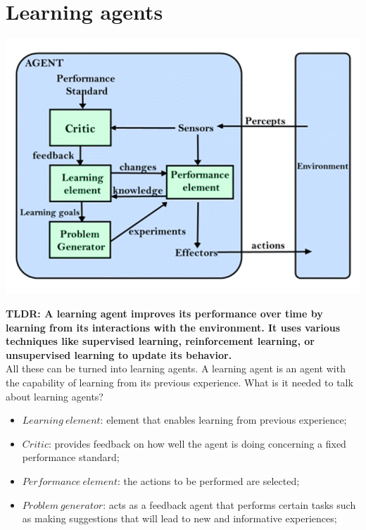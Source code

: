 \documentclass{article}
\begin{document}
\section{Learning agents}

\begin{center}
    \includegraphics[scale=0.4]{images/learning_agent.jpg}
\end{center}

\textbf{TLDR: A learning agent improves its performance over time by learning from its interactions with the environment. It uses various techniques like supervised learning, reinforcement learning, or unsupervised learning to update its behavior.} \\

All these can be turned into learning agents. A learning agent is an agent with the capability of learning from its previous experience. What is it needed to talk about learning agents?

\begin{itemize}
    \item $Learning\ element$: element that enables learning from previous experience;
    \item $Critic$: provides feedback on how well the agent is doing concerning a fixed performance standard;
    \item $Performance\ element$: the actions to be performed are selected;
    \item $Problem\ generator$: acts as a feedback agent that performs certain tasks such as making suggestions that will lead to new and informative experiences;
\end{itemize}
\end{document}
